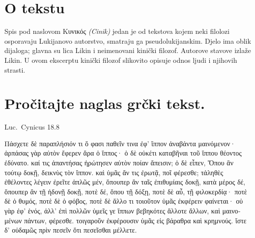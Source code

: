
\section*{O tekstu}

Spis pod naslovom Κυνικός \textit{(Cinik)} jedan je od tekstova kojem neki filolozi osporavaju Lukijanovo autorstvo, smatraju ga pseudolukijanskim. Djelo ima oblik dijaloga; glavna su lica Likin i neimenovani kinički filozof. Autorove stavove izlaže Likin. U ovom ekscerptu kinički filozof slikovito opisuje odnos ljudi i njihovih strasti.


\section*{Pročitajte naglas grčki tekst.}
Luc.\ Cynicus 18.8


\medskip

{\large
\begin{greek}
\noindent Πάσχετε δὲ παραπλήσιόν τι ὅ φασι παθεῖν τινα ἐφ' ἵππον ἀναβάντα μαινόμενον· ἁρπάσας γὰρ αὐτὸν ἔφερεν ἄρα ὁ ἵππος· ὁ δὲ οὐκέτι καταβῆναι τοῦ ἵππου θέοντος ἐδύνατο. καί τις ἀπαντήσας ἠρώτησεν αὐτὸν ποίαν ἄπεισιν; ὁ δὲ εἶπεν, Ὅπου ἂν τούτῳ δοκῇ, δεικνὺς τὸν ἵππον. καὶ ὑμᾶς ἄν τις ἐρωτᾷ, ποῖ φέρεσθε; τἀληθὲς ἐθέλοντες λέγειν ἐρεῖτε ἁπλῶς μέν, ὅπουπερ ἂν ταῖς ἐπιθυμίαις δοκῇ, κατὰ μέρος δέ, ὅπουπερ ἂν τῇ ἡδονῇ δοκῇ, ποτὲ δέ, ὅπου τῇ δόξῃ, ποτὲ δὲ αὖ, τῇ φιλοκερδίᾳ· ποτὲ δὲ ὁ θυμός, ποτὲ δὲ ὁ φόβος, ποτὲ δὲ ἄλλο τι τοιοῦτον ὑμᾶς ἐκφέρειν φαίνεται· οὐ γὰρ  ἐφ' ἑνός, ἀλλ' ἐπὶ πολλῶν ὑμεῖς γε ἵππων βεβηκότες ἄλλοτε ἄλλων, καὶ μαινομένων πάντων, φέρεσθε. τοιγαροῦν ἐκφέρουσιν ὑμᾶς εἰς βάραθρα καὶ κρημνούς. ἴστε δ' οὐδαμῶς πρὶν πεσεῖν ὅτι πεσεῖσθαι μέλλετε.

\end{greek}

}

